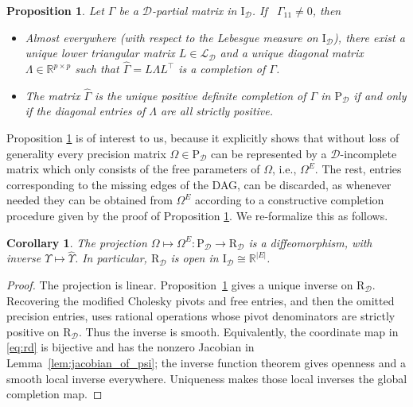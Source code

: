 \documentclass[12pt]{article}
\newcommand{\R}{\mathbb{R}}
\newcommand{\D}{\mathcal{D}}
\newcommand{\Pd}{\mathrm{P}_{\D}}
\theoremstyle{plain}
\newtheorem{proposition}[theorem]{Proposition}
\newtheorem{corollary}[theorem]{Corollary}
\theoremstyle{definition}
\theoremstyle{remark}
\begin{document}
      \begin{proposition}\cite{benraj12}\label{prop:completion_in_PD}
Let $\Gamma$ be a $\D$-partial matrix in $\mathrm{I}_{\D}$. If \ $\Gamma_{11}\neq 0$, then
\begin{itemize}
\renewcommand{\labelitemi}{$(a)$}
\item Almost everywhere (with respect to  the Lebesgue measure on $\mathrm{I}_{\D}$), there exist a unique lower triangular matrix $L\in \mathcal{L}_{\D}$  and a unique diagonal matrix $\Lambda \in \R^{p\times p}$ such that 
$\widehat{\Gamma}=L\Lambda L^{\top}$ is a completion of $\Gamma$.
\renewcommand{\labelitemi}{$(b)$}
\item The matrix $\widehat{\Gamma}$ is the unique positive definite completion of  $\Gamma$ in $\mathrm{P}_{\D}$ if and only if  the diagonal entries of $\Lambda$ are all strictly positive.
\end{itemize}
\end{proposition}

Proposition \ref{prop:completion_in_PD} is of interest to us, because it explicitly shows that without loss of generality every precision matrix  $\Omega\in \Pd$ can be represented by a $\D$-incomplete matrix which only consists of the free parameters of $\Omega$, i.e., $\Omega^E$. The rest, entries corresponding to the missing edges of the DAG, can be discarded, as whenever needed they can be obtained from $\Omega^E$ according to a constructive completion procedure given by the proof of Proposition \ref{prop:completion_in_PD}. We re-formalize this as follows.

 \begin{corollary} \label{cor:pg_rg}
 The projection
 $\Omega\mapsto\Omega^E:\mathrm P_{\D}\rightarrow\mathrm R_{\D}$
 is a diffeomorphism, with inverse
 $\Upsilon\mapsto\widehat\Upsilon$.  In particular,
 $\mathrm R_{\D}$ is open in
 $\mathrm I_{\D}\cong\R^{|E|}$.
 \end{corollary} 

 \begin{proof}
 The projection is linear.  Proposition~\ref{prop:completion_in_PD}
 gives a unique inverse on $\mathrm R_{\D}$.  Recovering the modified
 Cholesky pivots and free entries, and then the omitted precision
 entries, uses rational operations whose pivot denominators are
 strictly positive on $\mathrm R_{\D}$.  Thus the inverse is smooth.
 Equivalently, the coordinate map in \eqref{eq:rd} is bijective and has
 the nonzero Jacobian in Lemma~\ref{lem:jacobian_of_psi}; the inverse
 function theorem gives openness and a smooth local inverse everywhere.
 Uniqueness makes those local inverses the global completion map.
 \end{proof}
 
\end{document}
